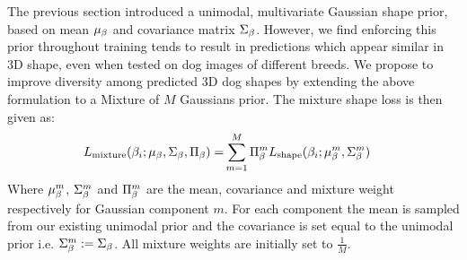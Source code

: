 






The previous section introduced a unimodal, multivariate Gaussian shape prior, based on mean $\mu_{\beta}$ and covariance matrix $\Sigma_{\beta}$. However, we find enforcing this prior throughout training tends to result in predictions which appear similar in 3D shape, even when tested on dog images of different breeds. We propose to improve diversity among predicted 3D dog shapes by extending the above formulation to a Mixture of $M$ Gaussians prior.  
The mixture shape loss is then given as:
\begin{align}
    L_{\textrm{mixture}}(\beta_{i}; \mu_{\beta}, \Sigma_{\beta}, \Pi_{\beta})
    =&
    \sum_{m=1}^M \Pi_{\beta}^{m}L_{\textrm{shape}}(\beta_{i}; \mu_{\beta}^{m}, \Sigma_{\beta}^{m})
\end{align}
Where $\mu_{\beta}^{m}$, $\Sigma_{\beta}^{m}$ and $\Pi_{\beta}^{m}$ 
are the mean, covariance and mixture weight respectively for Gaussian component 
$m$. For each component the mean is sampled from our existing unimodal prior and the covariance is set equal to the unimodal prior i.e. $\Sigma_{\beta}^{m} := \Sigma_{\beta}$. All mixture weights are initially set to $\frac{1}{M}$.

